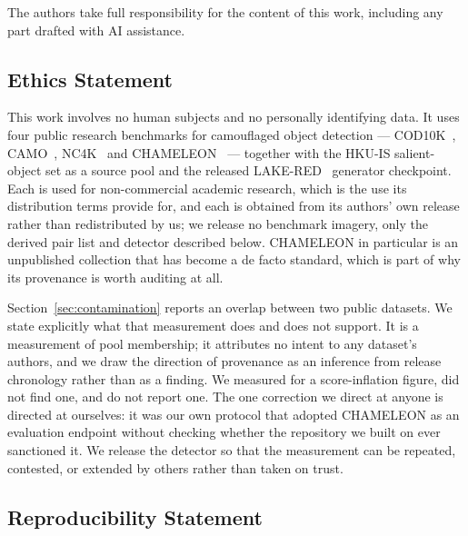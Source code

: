 \documentclass{article}
\begin{document}
The authors take full responsibility for the content of this work, including any part drafted with
AI assistance.

\subsection*{Ethics Statement}

This work involves no human subjects and no personally identifying data. It uses four public
research benchmarks for camouflaged object detection --- COD10K~\citep{fan2022concealed},
CAMO~\citep{le2019anabranch}, NC4K~\citep{lv2021simultaneously} and
CHAMELEON~\citep{skurowski2018animal} --- together with the HKU-IS salient-object set as a source
pool and the released LAKE-RED~\citep{zhao2024lakered} generator checkpoint. Each is used for
non-commercial academic research, which is the use its distribution terms provide for, and each is
obtained from its authors' own release rather than redistributed by us; we release no benchmark
imagery, only the derived pair list and detector described below.
CHAMELEON in particular is an unpublished collection that has become a de facto standard, which is
part of why its provenance is worth auditing at all.

Section~\ref{sec:contamination} reports an overlap between two public datasets. We state explicitly
what that measurement does and does not support. It is a measurement of pool membership; it attributes
no intent to any dataset's authors, and we draw the direction of provenance as an inference from
release chronology rather than as a finding. We measured for a score-inflation figure, did not find
one, and do not report one. The one correction we direct at anyone is directed at ourselves: it was
our own protocol that adopted CHAMELEON as an evaluation endpoint without checking whether the
repository we built on ever sanctioned it. We release the detector so that the measurement can be
repeated, contested, or extended by others rather than taken on trust.

\subsection*{Reproducibility Statement}
\end{document}
